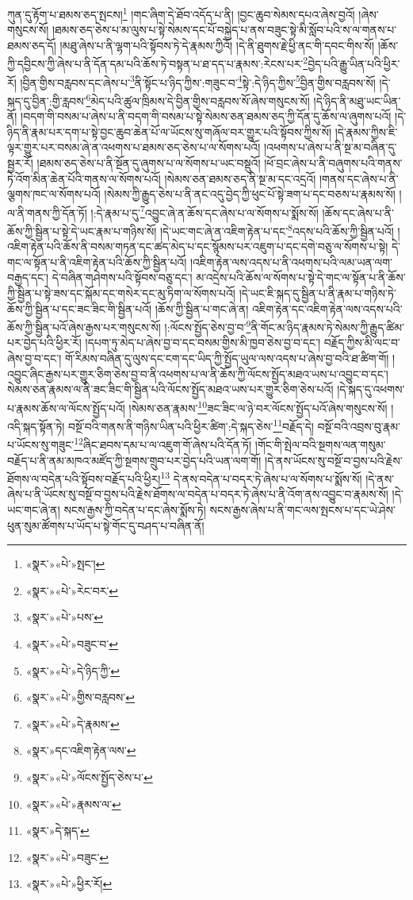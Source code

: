 ཀུན་དུ་རྟོག་པ་ཐམས་ཅད་སྤངས།\footnote{«སྣར་»«པེ་»སྤང་།} །གང་ཞིག་དེ་ཐོབ་འདོད་པ་ནི། །བྱང་ཆུབ་སེམས་དཔའ་ཞེས་བྱའོ། །ཞེས་གསུངས་སོ། །ཐམས་ཅད་ཅེས་པ་མ་ལུས་པ་སྟེ་སེམས་དང་པོ་བསྐྱེད་པ་ནས་བཟུང་སྟེ་མི་སློབ་པའི་ས་ལ་གནས་པ་ཐམས་ཅད་དོ། །མཐུ་ཞེས་པ་ནི་ལྷག་པའི་སྟོབས་ཏེ་དེ་རྣམས་ཀྱིའོ། །དེ་ནི་ཐུགས་རྗེ་ཕྱི་ནང་གི་དབང་གིས་སོ། །ཆོས་ཀྱི་དབྱིངས་ཀྱི་ཞེས་པ་ནི་དོན་དམ་པའི་ཆོས་ཏེ་བསྟན་པ་ཐ་དད་པ་རྣམས་:རེངས་པར་\footnote{«སྣར་»«པེ་»རེང་བར་}བྱེད་པའི་རྒྱུ་ཡིན་པའི་ཕྱིར་རོ། །བྱིན་གྱིས་བརླབས་དང་ཞེས་པ་\footnote{«སྣར་»«པེ་»པས་}ནི་སྟོང་པ་ཉིད་ཀྱིས་:གཟུང་བ་\footnote{«སྣར་»«པེ་»བཟུང་བ་}སྟེ་:དེ་ཉིད་ཀྱིས་\footnote{«སྣར་»«པེ་»དེ་ཉིད་ཀྱི་}བྱིན་གྱིས་བརླབས་སོ། །དེ་སྐད་དུ་བྱིན་:གྱི་རླབས་\footnote{«སྣར་»«པེ་»གྱིས་བརླབས་}མེད་པའི་ཚུལ་ཁྲིམས་དེ་བྱིན་གྱིས་བརླབས་སོ་ཞེས་གསུངས་སོ། །དེ་ཉིད་ནི་མཐུ་ཡང་ཡིན་ནོ། །བདག་གི་བསམ་པ་ཞེས་པ་ནི་བདག་གི་བསམ་པ་སྟེ་སེམས་ཅན་ཐམས་ཅད་ཀྱི་དོན་དུ་ཆོས་ལ་ཞུགས་པའོ། །དེ་ཉིད་ནི་རྣམ་པར་དག་པ་སྟེ་བྱང་ཆུབ་ཆེན་པོ་ལ་ཡོངས་སུ་གཞོལ་བར་གྱུར་པའི་སྟོབས་ཀྱིས་སོ། །དེ་རྣམས་ཀྱིས་ཇི་ལྟར་གྱུར་པར་བསམ་ཞེ་ན་འཕགས་པ་ཐམས་ཅད་ཅེས་པ་ལ་སོགས་པའོ། །འཕགས་པ་ཞེས་པ་ནི་སྔ་མ་བཞིན་དུ་སྦྱར་རོ། །ཐམས་ཅད་ཅེས་པ་ནི་སྔོན་དུ་ཞུགས་པ་ལ་སོགས་པ་ཡང་བསྡུའོ། །ཕོ་བྲང་ཞེས་པ་ནི་བཞུགས་པའི་གནས་ཏེ་འོག་མིན་ཆེན་པོའི་གནས་ལ་སོགས་པའོ། །སེམས་ཅན་ཐམས་ཅད་ནི་སྔ་མ་དང་འདྲའོ། །གནས་དང་ཞེས་པ་ནི་ལྕགས་ཁང་ལ་སོགས་པའོ། །སེམས་ཀྱི་རྒྱུད་ཅེས་པ་ནི་ནང་འདུ་བྱེད་ཀྱི་ཕུང་པོ་སྟེ་ཟག་པ་དང་བཅས་པ་རྣམས་སོ། །ལ་ནི་གནས་ཀྱི་དོན་ཏོ། །:དེ་རྣམ་པ་དུ་\footnote{«སྣར་»«པེ་»དེ་རྣམས་}འབྱུང་ཞེ་ན་ཆོས་དང་ཞེས་པ་ལ་སོགས་པ་སྨོས་སོ། །ཆོས་དང་ཞེས་པ་ནི་ཆོས་ཀྱི་སྦྱིན་པ་སྟེ་དེ་ཡང་རྣམ་པ་གཉིས་སོ། །དེ་ཡང་གང་ཞེ་ན་འཇིག་རྟེན་པ་དང་\footnote{«སྣར་»དང་འཇིག་རྟེན་ལས་}འདས་པའི་ཆོས་ཀྱི་སྦྱིན་པའོ། །འཇིག་རྟེན་པའི་ཆོས་ནི་བསམ་གཏན་དང་ཚད་མེད་པ་དང་སྙོམས་པར་འཇུག་པ་དང་དགེ་བཅུ་ལ་སོགས་པ་སྟེ། དེ་གང་ལ་སྟོན་པ་ནི་འཇིག་རྟེན་པའི་ཆོས་ཀྱི་སྦྱིན་པའོ། །འཇིག་རྟེན་ལས་འདས་པ་ནི་འཕགས་པའི་ལམ་ཡན་ལག་བརྒྱད་དང་། དེ་བཞིན་གཤེགས་པའི་སྟོབས་བཅུ་དང་། མ་འདྲེས་པའི་ཆོས་ལ་སོགས་པ་སྟེ་དེ་གང་ལ་སྟོན་པ་ནི་ཆོས་ཀྱི་སྦྱིན་པ་སྟེ་ཟས་དང་སྐོམ་དང་གསེར་དང་མུ་ཏིག་ལ་སོགས་པའོ། །དེ་ཡང་ཇི་སྐད་དུ་སྦྱིན་པ་ནི་རྣམ་པ་གཉིས་ཏེ་ཆོས་ཀྱི་སྦྱིན་པ་དང་ཟང་ཟིང་གི་སྦྱིན་པའོ། །ཆོས་ཀྱི་སྦྱིན་པ་གང་ཞེ་ན། འཇིག་རྟེན་དང་འཇིག་རྟེན་ལས་འདས་པའི་ཆོས་ཀྱི་སྦྱིན་པའོ་ཞེས་རྒྱས་པར་གསུངས་སོ། །:ལོངས་སྤྱོད་ཅེས་བྱ་བ་\footnote{«སྣར་»«པེ་»ལོངས་སྤྱོད་ཅེས་པ་}ནི་གོང་མ་ཉིད་རྣམས་ཏེ་སེམས་ཀྱི་རྒྱུད་ཚིམ་པར་བྱེད་པའི་ཕྱིར་རོ། །དཔག་ཏུ་མེད་པ་ཞེས་བྱ་བ་དང་བསམ་གྱིས་མི་ཁྱབ་ཅེས་བྱ་བ་དང་། བརྗོད་ཀྱིས་མི་ལང་བ་ཞེས་བྱ་བ་དང་། གོ་རིམས་བཞིན་དུ་ལུས་དང་ངག་དང་ཡིད་ཀྱི་སྤྱོད་ཡུལ་ལས་འདས་པ་ཞེས་བྱ་བའི་ཐ་ཚིག་གོ། །འབྱུང་ཞིང་རྒྱས་པར་གྱུར་ཅིག་ཅེས་བྱ་བ་ནི་འཕགས་པ་ལ་ནི་ཆོས་ཀྱི་ལོངས་སྤྱོད་མཐའ་ཡས་པ་འབྱུང་བ་དང་། སེམས་ཅན་རྣམས་ལ་ནི་ཟང་ཟིང་གི་སྦྱིན་པའི་ལོངས་སྤྱོད་མཐའ་ཡས་པར་གྱུར་ཅིག་ཅེས་པའོ། །དེ་སྐད་དུ་འཕགས་པ་རྣམས་ཆོས་ལ་ལོངས་སྤྱོད་པའོ། །སེམས་ཅན་རྣམས་\footnote{«སྣར་»«པེ་»རྣམས་ལ་}ཟང་ཟིང་ལ་ཉེ་བར་ལོངས་སྤྱོད་པའོ་ཞེས་གསུངས་སོ། །འདི་སྐད་སྟོན་ཏེ། བསྔོ་བའི་གནས་ནི་གཉིས་ཡིན་པའི་ཕྱིར་ཚིག་:དེ་སྐད་ཅེས་\footnote{«སྣར་»དེ་སྐད་}བརྗོད་དེ། བསྔོ་བའི་འབྲས་བུ་རྣམ་པ་ཡོངས་སུ་གཟུང་\footnote{«སྣར་»«པེ་»བཟུང་}ཞིང་ཐབས་དམ་པ་ལ་འཇུག་གོ་ཞེས་པའི་དོན་ཏོ། །གོང་གི་སྤེལ་བའི་སྔགས་ལན་གསུམ་བརྗོད་པ་ནི་ནམ་མཁའ་མཛོད་ཀྱི་སྔགས་གྲུབ་པར་བྱེད་པའི་ཡན་ལག་གོ། །དེ་ནས་ཡོངས་སུ་བསྔོ་བ་བྱས་པའི་རྗེས་ཐོགས་ལ་བདེན་པའི་སྟོབས་བརྗོད་པའི་ཕྱིར།\footnote{«སྣར་»«པེ་»ཕྱིར་རོ།} དེ་ནས་བདེན་པ་བདར་ཏེ་ཞེས་པ་ལ་སོགས་པ་སྨོས་སོ། །དེ་ནས་ཞེས་པ་ནི་ཡོངས་སུ་བསྔོ་བ་བྱས་པའི་རྗེས་ཐོགས་ལ་བདེན་པ་བདར་ཏེ་ཞེས་པ་ནི་འོག་ནས་འབྱུང་བ་རྣམས་སོ། །དེ་ཡང་གང་ཞེ་ན། སངས་རྒྱས་ཀྱི་བདེན་པ་དང་ཞེས་སྨོས་ཏེ། སངས་རྒྱས་ཞེས་པ་ནི་གང་ལས་སྤངས་པ་དང་ཡེ་ཤེས་ཕུན་སུམ་ཚོགས་པ་ཡོད་པ་སྟེ་གོང་དུ་བཤད་པ་བཞིན་ནོ། 